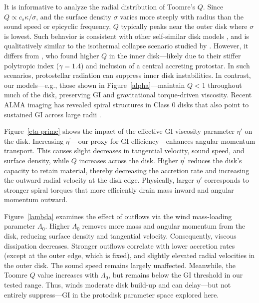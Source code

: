 \documentclass[twocolumn,linenumbers]{aastex631}
\begin{document}
It is informative to analyze the radial distribution of Toomre's $Q$. Since $Q \propto c_s \kappa / \sigma$, and the surface density $\sigma$ varies more steeply with radius than the sound speed or epicyclic frequency, $Q$ typically peaks near the outer disk where $\sigma$ is lowest. Such behavior is consistent with other self-similar disk models \citep{shadmehri2009influence, abbassi2013viscous}, and is qualitatively similar to the isothermal collapse scenario studied by \cite{nomura2000angular}. However, it differs from \cite{ohtani2013growth}, who found higher $Q$ in the inner disk—likely due to their stiffer polytropic index ($\gamma = 1.4$) and inclusion of a central accreting protostar. In such scenarios, protostellar radiation can suppress inner disk instabilities. In contrast, our models—e.g., those shown in Figure~\ref{alpha}—maintain $Q < 1$ throughout much of the disk, preserving GI and gravitational torque-driven viscosity. Recent ALMA imaging has revealed spiral structures in Class 0 disks that also point to sustained GI across large radii \citep{segura2020alma}. 


Figure~\ref{eta-prime} shows the impact of the effective GI viscosity parameter $\eta'$ on the disk. Increasing $\eta^{\prime}$—our proxy for GI efficiency—enhances angular momentum transport. This causes slight decreases in tangential velocity, sound speed, and surface density, while $Q$ increases across the disk. Higher $\eta^{\prime}$ reduces the disk’s capacity to retain material, thereby decreasing the accretion rate and increasing the outward radial velocity at the disk edge. Physically, larger $\eta'$ corresponds to stronger spiral torques that more efficiently drain mass inward and angular momentum outward.

Figure~\ref{lambda} examines the effect of outflows via the wind mass-loading parameter $\Lambda_0$. Higher $\Lambda_0$ removes more mass and angular momentum from the disk, reducing surface density and tangential velocity. Consequently, viscous dissipation decreases. Stronger outflows correlate with lower accretion rates (except at the outer edge, which is fixed), and slightly elevated radial velocities in the outer disk. The sound speed remains largely unaffected. Meanwhile, the Toomre $Q$ value increases with $\Lambda_0$, but remains below the GI threshold in our tested range. Thus, winds moderate disk build-up and can delay—but not entirely suppress—GI in the protodisk parameter space explored here.
\end{document}
